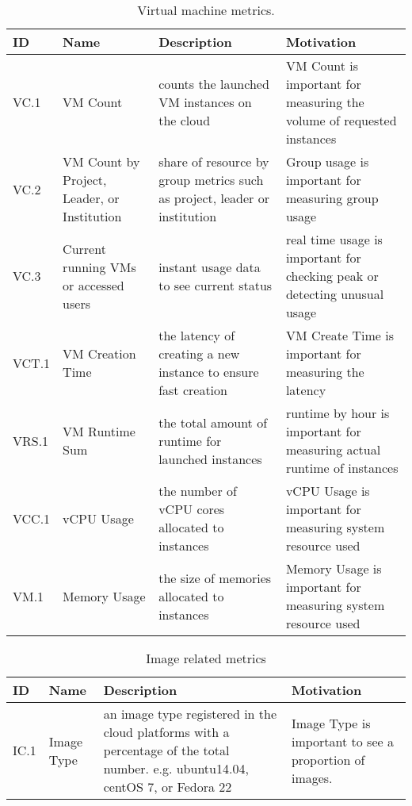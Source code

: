 \begin{table*}[P]
\caption{Virtual machine metrics.}
\begin{scriptsize}
\label{T:metrics}
\bigskip
\begin{center}
\begin{tabular}{lp{}p{}p{}}
\hline
\rowcolor{blue!20} \bf ID & \bf Name & \bf Description & \bf Motivation \\
\hline 
VC.1&
VM Count & 
 counts the launched VM instances on the cloud &
VM Count is important for measuring the volume of requested instances \\
\hline
VC.2&
VM Count by Project, Leader, or Institution &
share of resource by group metrics such as project, leader or institution &
Group usage is important for measuring group usage \\
\hline
VC.3 &
Current running VMs or accessed users &
instant usage data to see current status &
real time usage is important for checking peak or detecting unusual usage \\
\hline
VCT.1 &
VM Creation Time &
the latency of creating a new instance to ensure fast creation &
VM Create Time is important for measuring the latency \\
\hline
VRS.1&
VM Runtime Sum&
the total amount of runtime for launched instances &
runtime by hour is important for measuring actual runtime of instances \\
\hline
VCC.1 &
vCPU Usage &
the number of vCPU cores allocated to instances &
vCPU Usage is important for measuring system resource used \\
\hline
VM.1 &
Memory Usage &
the size of memories allocated to instances &
Memory Usage is important for measuring system resource used \\
\hline
\end{tabular}
\end{center}
\end{scriptsize}
\end{table*}

\begin{table*}[P]
\caption{Image related metrics}
\begin{scriptsize}
\label{T:metrics}
\bigskip
\begin{center}
\begin{tabular}{lp{}p{}p{}}
\hline
\rowcolor{blue!20} \bf ID & \bf Name & \bf Description & \bf Motivation \\
\hline 
IC.1 &
Image Type &
an image type registered in the cloud platforms with a
percentage of the total number. e.g. ubuntu14.04, centOS 7, or Fedora 22 & 
Image Type is important to see a proportion of images. \\
\hline
\end{tabular}
\end{center}
\end{scriptsize}
\end{table*}

